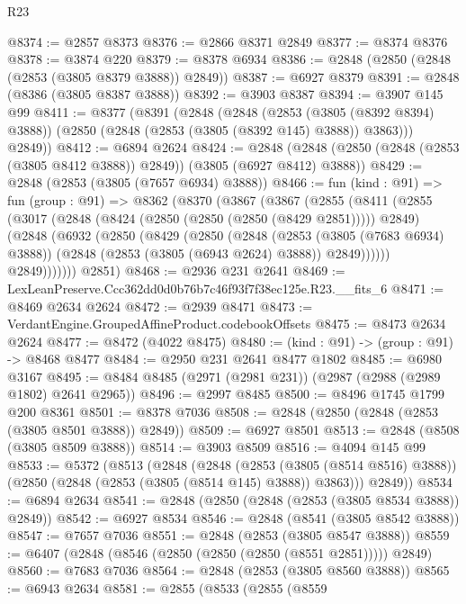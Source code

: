 \begin{lexlean}{R23}
\begin{coremodule}
@8374 := @2857 @8373
@8376 := @2866 @8371 @2849
@8377 := @8374 @8376
@8378 := @3874 @220
@8379 := @8378 @6934
@8386 := @2848 (@2850 (@2848 (@2853 (@3805 @8379 @3888)) @2849))
@8387 := @6927 @8379
@8391 := @2848 (@8386 (@3805 @8387 @3888))
@8392 := @3903 @8387
@8394 := @3907 @145 @99
@8411 := @8377
    (@8391
      (@2848
        (@2848
          (@2853 (@3805 (@8392 @8394) @3888))
          (@2850 (@2848 (@2853 (@3805 (@8392 @145) @3888)) @3863)))
        @2849))
@8412 := @6894 @2624
@8424 := @2848 (@2848 (@2850 (@2848 (@2853 (@3805 @8412 @3888)) @2849)) (@3805 (@6927 @8412) @3888))
@8429 := @2848 (@2853 (@3805 (@7657 @6934) @3888))
@8466 := fun (kind : @91) =>
  fun (group : @91) =>
  @8362
    (@8370
      (@3867
        (@3867
          (@2855
            (@8411
              (@2855
                (@3017
                  (@2848 (@8424 (@2850 (@2850 (@2850 (@8429 @2851))))) @2849)
                  (@2848
                    (@6932
                      (@2850
                        (@8429
                          (@2850
                            (@2848
                              (@2853 (@3805 (@7683 @6934) @3888))
                              (@2848 (@2853 (@3805 (@6943 @2624) @3888)) @2849))))))
                    @2849)))))))
      @2851)
@8468 := @2936 @231 @2641
@8469 := LexLeanPreserve.Ccc362dd0d0b76b7c46f93f7f38ec125e.R23.__fits_6
@8471 := @8469 @2634 @2624
@8472 := @2939 @8471
@8473 := VerdantEngine.GroupedAffineProduct.codebookOffsets
@8475 := @8473 @2634 @2624
@8477 := @8472 (@4022 @8475)
@8480 := (kind : @91) -> (group : @91) -> @8468 @8477
@8484 := @2950 @231 @2641 @8477 @1802
@8485 := @6980 @3167
@8495 := @8484 @8485 (@2971 (@2981 @231)) (@2987 (@2988 (@2989 @1802) @2641 @2965))
@8496 := @2997 @8485
@8500 := @8496 @1745 @1799 @200 @8361
@8501 := @8378 @7036
@8508 := @2848 (@2850 (@2848 (@2853 (@3805 @8501 @3888)) @2849))
@8509 := @6927 @8501
@8513 := @2848 (@8508 (@3805 @8509 @3888))
@8514 := @3903 @8509
@8516 := @4094 @145 @99
@8533 := @5372
    (@8513
      (@2848
        (@2848
          (@2853 (@3805 (@8514 @8516) @3888))
          (@2850 (@2848 (@2853 (@3805 (@8514 @145) @3888)) @3863)))
        @2849))
@8534 := @6894 @2634
@8541 := @2848 (@2850 (@2848 (@2853 (@3805 @8534 @3888)) @2849))
@8542 := @6927 @8534
@8546 := @2848 (@8541 (@3805 @8542 @3888))
@8547 := @7657 @7036
@8551 := @2848 (@2853 (@3805 @8547 @3888))
@8559 := @6407 (@2848 (@8546 (@2850 (@2850 (@2850 (@8551 @2851))))) @2849)
@8560 := @7683 @7036
@8564 := @2848 (@2853 (@3805 @8560 @3888))
@8565 := @6943 @2634
@8581 := @2855
    (@8533
      (@2855
        (@8559

\end{coremodule}
\end{lexlean}

